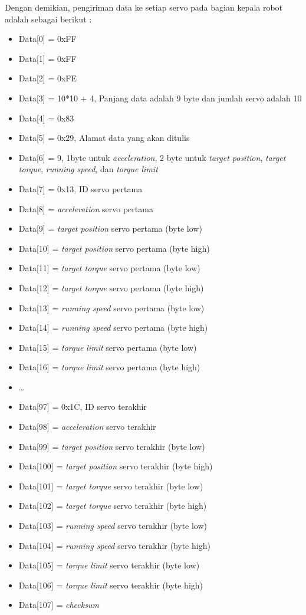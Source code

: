 Dengan demikian, pengiriman data ke setiap servo pada bagian kepala robot adalah
sebagai berikut : 
\begin{itemize}
    \item Data[0] = 0xFF
    \item Data[1] = 0xFF
    \item Data[2] = 0xFE
    \item Data[3] = 10*10 + 4, Panjang data adalah 9 byte dan jumlah servo adalah 10
    \item Data[4] = 0x83
    \item Data[5] = 0x29, Alamat data yang akan ditulis
    \item Data[6] = 9, 1byte untuk \emph{acceleration}, 2 byte untuk \emph{target position},
    \emph{target torque}, \emph{running speed}, dan \emph{torque limit}
    \item Data[7] = 0x13, ID servo pertama
    \item Data[8] = \emph{acceleration} servo pertama
    \item Data[9] = \emph{target position} servo pertama (byte low)
    \item Data[10] = \emph{target position} servo pertama (byte high)
    \item Data[11] = \emph{target torque} servo pertama (byte low)
    \item Data[12] = \emph{target torque} servo pertama (byte high)
    \item Data[13] = \emph{running speed} servo pertama (byte low)
    \item Data[14] = \emph{running speed} servo pertama (byte high)
    \item Data[15] = \emph{torque limit} servo pertama (byte low)
    \item Data[16] = \emph{torque limit} servo pertama (byte high)
    \item \dots
    \item Data[97] = 0x1C, ID servo terakhir
    \item Data[98] = \emph{acceleration} servo terakhir
    \item Data[99] = \emph{target position} servo terakhir (byte low)
    \item Data[100] = \emph{target position} servo terakhir (byte high)
    \item Data[101] = \emph{target torque} servo terakhir (byte low)
    \item Data[102] = \emph{target torque} servo terakhir (byte high)
    \item Data[103] = \emph{running speed} servo terakhir (byte low)
    \item Data[104] = \emph{running speed} servo terakhir (byte high)
    \item Data[105] = \emph{torque limit} servo terakhir (byte low)
    \item Data[106] = \emph{torque limit} servo terakhir (byte high)
    \item Data[107] = \emph{checksum}
\end{itemize}

